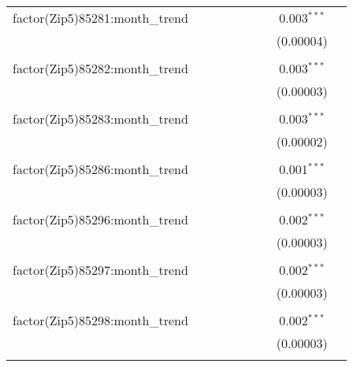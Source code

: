 \begin{table}[H]
{\begin{tabular}{@{\extracolsep{5pt}}lcccccccc}
  factor(Zip5)85281:month\_trend &  &  &  &  &  &  & 0.003$^{***}$ &  \\  

   &  &  &  &  &  &  & (0.00004) &  \\  

   & & & & & & & & \\  

  factor(Zip5)85282:month\_trend &  &  &  &  &  &  & 0.003$^{***}$ &  \\  

   &  &  &  &  &  &  & (0.00003) &  \\  

   & & & & & & & & \\  

  factor(Zip5)85283:month\_trend &  &  &  &  &  &  & 0.003$^{***}$ &  \\  

   &  &  &  &  &  &  & (0.00002) &  \\  

   & & & & & & & & \\  

  factor(Zip5)85286:month\_trend &  &  &  &  &  &  & 0.001$^{***}$ &  \\  

   &  &  &  &  &  &  & (0.00003) &  \\  

   & & & & & & & & \\  

  factor(Zip5)85296:month\_trend &  &  &  &  &  &  & 0.002$^{***}$ &  \\  

   &  &  &  &  &  &  & (0.00003) &  \\  

   & & & & & & & & \\  

  factor(Zip5)85297:month\_trend &  &  &  &  &  &  & 0.002$^{***}$ &  \\  

   &  &  &  &  &  &  & (0.00003) &  \\  

   & & & & & & & & \\  

  factor(Zip5)85298:month\_trend &  &  &  &  &  &  & 0.002$^{***}$ &  \\  

   &  &  &  &  &  &  & (0.00003) &  \\  

   & & & & & & & & \\  


\end{tabular}}
\end{table}
